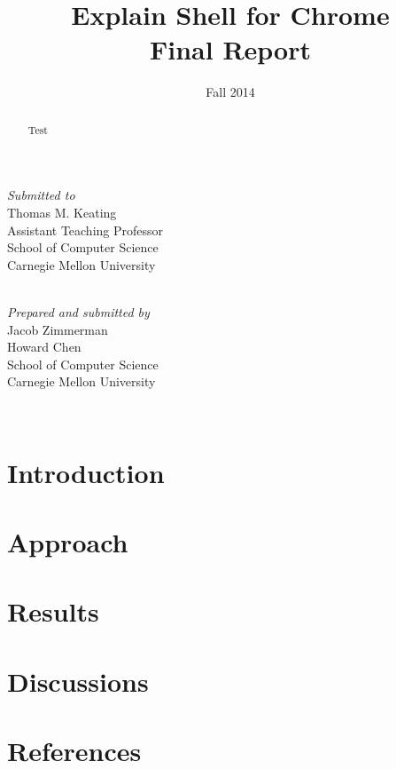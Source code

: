 \documentclass[11pt]{article}
\title{Explain Shell for Chrome\\Final Report}
\date{Fall 2014}
\begin{document}


\thispagestyle{empty}
\maketitle
\thispagestyle{empty}

\begin{center}
  \textit{Submitted to} \\
  Thomas M. Keating \\
  Assistant Teaching Professor \\
  School of Computer Science \\
  Carnegie Mellon University

  \mbox{} \\

  \textit{Prepared and submitted by} \\
  Jacob Zimmerman \\
  Howard Chen \\
  School of Computer Science \\
  Carnegie Mellon University

  \mbox{} \\
\end{center}

\begin{abstract}
  Test
\end{abstract}

\newpage

\tableofcontents

\newpage

\section{Introduction}

\section{Approach}

\section{Results}

\section{Discussions}

\section{References}
\end{document}
